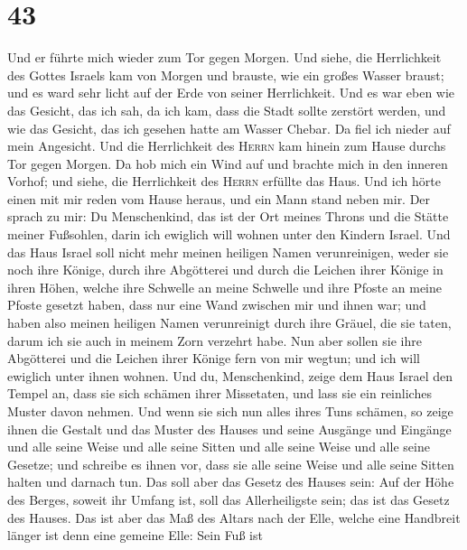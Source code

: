 \hypertarget{section-42}{%
\section{43}\label{section-42}}

 Und er führte mich wieder zum Tor gegen Morgen.
 Und siehe, die Herrlichkeit des Gottes Israels kam von
Morgen und brauste, wie ein großes Wasser braust; und es ward sehr licht
auf der Erde von seiner Herrlichkeit.  Und es war eben wie
das Gesicht, das ich sah, da ich kam, dass die Stadt sollte zerstört
werden, und wie das Gesicht, das ich gesehen hatte am Wasser Chebar. Da
fiel ich nieder auf mein Angesicht.  Und die Herrlichkeit
des \textsc{Herrn} kam hinein zum Hause durchs Tor gegen Morgen.
 Da hob mich ein Wind auf und brachte mich in den inneren
Vorhof; und siehe, die Herrlichkeit des \textsc{Herrn} erfüllte das
Haus.  Und ich hörte einen mit mir reden vom Hause heraus,
und ein Mann stand neben mir.  Der sprach zu mir: Du
Menschenkind, das ist der Ort meines Throns und die Stätte meiner
Fußsohlen, darin ich ewiglich will wohnen unter den Kindern Israel. Und
das Haus Israel soll nicht mehr meinen heiligen Namen verunreinigen,
weder sie noch ihre Könige, durch ihre Abgötterei und durch die Leichen
ihrer Könige in ihren Höhen,  welche ihre Schwelle an
meine Schwelle und ihre Pfoste an meine Pfoste gesetzt haben, dass nur
eine Wand zwischen mir und ihnen war; und haben also meinen heiligen
Namen verunreinigt durch ihre Gräuel, die sie taten, darum ich sie auch
in meinem Zorn verzehrt habe.  Nun aber sollen sie ihre
Abgötterei und die Leichen ihrer Könige fern von mir wegtun; und ich
will ewiglich unter ihnen wohnen.  Und du, Menschenkind,
zeige dem Haus Israel den Tempel an, dass sie sich schämen ihrer
Missetaten, und lass sie ein reinliches Muster davon nehmen.
 Und wenn sie sich nun alles ihres Tuns schämen, so zeige
ihnen die Gestalt und das Muster des Hauses und seine Ausgänge und
Eingänge und alle seine Weise und alle seine Sitten und alle seine Weise
und alle seine Gesetze; und schreibe es ihnen vor, dass sie alle seine
Weise und alle seine Sitten halten und darnach tun.  Das
soll aber das Gesetz des Hauses sein: Auf der Höhe des Berges, soweit
ihr Umfang ist, soll das Allerheiligste sein; das ist das Gesetz des
Hauses.  Das ist aber das Maß des Altars nach der Elle,
welche eine Handbreit länger ist denn eine gemeine Elle: Sein Fuß ist
